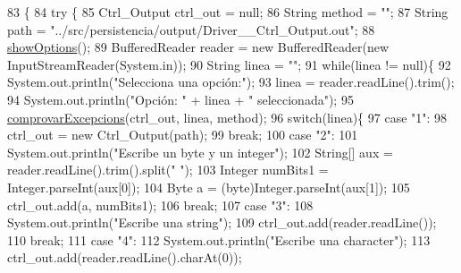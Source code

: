 \begin{DoxyCode}
83                                            \{
84         \textcolor{keywordflow}{try} \{
85             Ctrl\_Output ctrl\_out = null;
86             String method = \textcolor{stringliteral}{""};
87             String path = \textcolor{stringliteral}{"../src/persistencia/output/Driver\_\_Ctrl\_Output.out"};
88             \hyperlink{classpersistencia_1_1output_1_1Driver____Ctrl__Output_aceadcc132060c8491487c7d20a382c5b}{showOptions}();
89             BufferedReader reader = \textcolor{keyword}{new} BufferedReader(\textcolor{keyword}{new} InputStreamReader(System.in));
90             String linea = \textcolor{stringliteral}{""};
91             \textcolor{keywordflow}{while}(linea != null)\{
92                 System.out.println(\textcolor{stringliteral}{"Selecciona una opción:"});
93                 linea = reader.readLine().trim();
94                 System.out.println(\textcolor{stringliteral}{"Opción: "} + linea + \textcolor{stringliteral}{" seleccionada"});
95                 \hyperlink{classpersistencia_1_1output_1_1Driver____Ctrl__Output_a19885299457cf4049efde8b78a0f7627}{comprovarExcepcions}(ctrl\_out, linea, method);
96                 \textcolor{keywordflow}{switch}(linea)\{
97                     \textcolor{keywordflow}{case} \textcolor{stringliteral}{"1"}:
98                         ctrl\_out = \textcolor{keyword}{new} Ctrl\_Output(path);
99                     \textcolor{keywordflow}{break};
100                     \textcolor{keywordflow}{case} \textcolor{stringliteral}{"2"}:
101                         System.out.println(\textcolor{stringliteral}{"Escribe un byte y un integer"});
102                         String[] aux = reader.readLine().trim().split(\textcolor{stringliteral}{" "});
103                         Integer numBits1 = Integer.parseInt(aux[0]);
104                         Byte a = (byte)Integer.parseInt(aux[1]);
105                         ctrl\_out.add(a, numBits1);
106                     \textcolor{keywordflow}{break};
107                     \textcolor{keywordflow}{case} \textcolor{stringliteral}{"3"}:
108                         System.out.println(\textcolor{stringliteral}{"Escribe una string"});
109                         ctrl\_out.add(reader.readLine());
110                     \textcolor{keywordflow}{break};
111                     \textcolor{keywordflow}{case} \textcolor{stringliteral}{"4"}:
112                         System.out.println(\textcolor{stringliteral}{"Escribe una character"});
113                         ctrl\_out.add(reader.readLine().charAt(0));

\end{DoxyCode}
